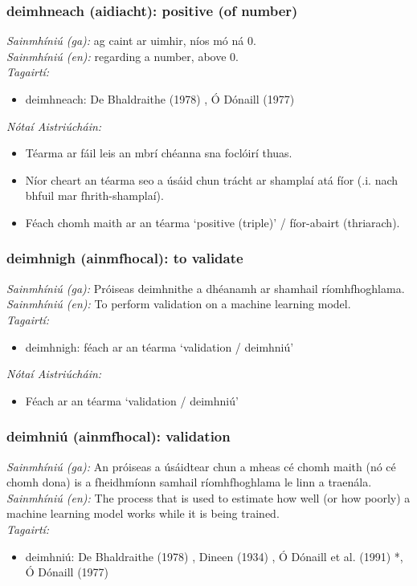 \subsubsection*{deimhneach (aidiacht): positive (of number)}
 \noindent \textit{Sainmhíniú (ga):} ag caint ar uimhir, níos mó ná 0.
\\
 \noindent \textit{Sainmhíniú (en):} regarding a number, above 0.
\\
 \noindent \textit{Tagairtí:}
\begin{itemize}
	\item deimhneach: De Bhaldraithe (1978) \cite{de-bhaldraithe}, Ó Dónaill (1977) \cite{odonaill}
\end{itemize}

 \noindent \textit{Nótaí Aistriúcháin:}
\begin{itemize}
	\item Téarma ar fáil leis an mbrí chéanna sna foclóirí thuas.
	\item Níor cheart an téarma seo a úsáid chun trácht ar shamplaí atá fíor (.i. nach bhfuil mar fhrith-shamplaí).
	\item Féach chomh maith ar an téarma `positive (triple)' / fíor-abairt (thriarach).
\end{itemize}


\subsubsection*{deimhnigh (ainmfhocal): to validate}
 \noindent \textit{Sainmhíniú (ga):} Próiseas deimhnithe a dhéanamh ar shamhail ríomhfhoghlama.
\\
 \noindent \textit{Sainmhíniú (en):} To perform validation on a machine learning model.
\\
 \noindent \textit{Tagairtí:}
\begin{itemize}
	\item deimhnigh: féach ar an téarma `validation / deimhniú'
\end{itemize}

 \noindent \textit{Nótaí Aistriúcháin:}
\begin{itemize}
	\item Féach ar an téarma `validation / deimhniú'
\end{itemize}


\subsubsection*{deimhniú (ainmfhocal): validation}
 \noindent \textit{Sainmhíniú (ga):} An próiseas a úsáidtear chun a mheas cé chomh maith (nó cé chomh dona) is a fheidhmíonn samhail ríomhfhoghlama le linn a traenála.
\\
 \noindent \textit{Sainmhíniú (en):} The process that is used to estimate how well (or how poorly) a machine learning model works while it is being trained.
\\
 \noindent \textit{Tagairtí:}
\begin{itemize}
	\item deimhniú: De Bhaldraithe (1978) \cite{de-bhaldraithe}, Dineen (1934) \cite{dineen}, Ó Dónaill et al. (1991) \cite{focloir-beag}*, Ó Dónaill (1977) \cite{odonaill}
\end{itemize}

